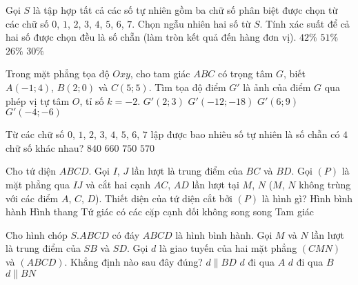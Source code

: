 \begin{ex}%
	Gọi $S$ là tập hợp tất cả các số tự nhiên gồm ba chữ số phân biệt được chọn từ các chữ số $0$, $1$, $2$, $3$, $4$, $5$, $6$, $7$. Chọn ngẫu nhiên hai số từ $S$.  Tính xác suất để cả hai số được chọn đều là số chẵn (làm tròn kết quả đến hàng đơn vị).
\choice
{$42\%$}
{$51\%$}
{\True $26\%$}
{$30\%$}
\end{ex}
\begin{ex}%
	Trong mặt phẳng tọa độ $Oxy$, cho tam giác $ABC$ có trọng tâm $G$, biết $A(-1;4)$, $B(2;0)$ và $C(5;5)$. Tìm tọa độ điểm $G'$ là ảnh của điểm $G$ qua phép vị tự tâm $O$, tỉ số $k=-2$.
\choice
{$G'(2;3)$}
{$G'(-12;-18)$}
{$G'(6;9)$}
{\True $G'(-4;-6)$}
\end{ex}
\begin{ex}%
	Từ các chữ số $0$, $1$, $2$, $3$, $4$, $5$, $6$, $7$ lập được bao nhiêu số tự nhiên là số chẵn có $4$ chữ số khác nhau?
\choice
{$840$}
{$660$}
{\True $750$}
{$570$}
\end{ex}
\begin{ex}%
Cho tứ diện $ABCD$. Gọi $I$, $J$ lần lượt là trung điểm của $BC$ và $BD$. Gọi $(P)$ là mặt phẳng qua $IJ$ và cắt hai cạnh $AC$, $AD$ lần lượt tại $M$, $N$ ($M$, $N$ không trùng với các điểm $A$, $C$, $D$). Thiết diện của tứ diện cắt bởi $(P)$ là hình gì?
	\choice
	{Hình bình hành}
	{\True Hình thang}
	{Tứ giác có các cặp cạnh đối không song song}
	{Tam giác}
\end{ex}
\begin{ex}%
Cho hình chóp $S.ABCD$ có đáy $ABCD$ là hình bình hành. Gọi $M$ và $N$ lần lượt là trung điểm của $SB$ và $SD$. Gọi $d$ là giao tuyến của hai mặt phẳng $(CMN)$ và $(ABCD)$. Khẳng định nào sau đây đúng?
\choice
{\True $d \parallel BD$}
{$d$ đi qua $A$}
{$d$ đi qua $B$}
{$d \parallel BN$}
\end{ex}
